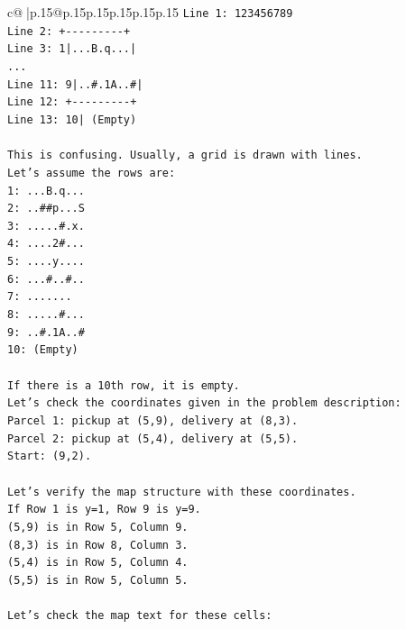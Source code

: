 \documentclass{article}
\begin{document}
{\begin{supertabular}{c@{$\;$}|p{.15\linewidth}@{}p{.15\linewidth}p{.15\linewidth}p{.15\linewidth}p{.15\linewidth}p{.15\linewidth}}
{{{\texttt{Line 1: 123456789} \\
\texttt{Line 2: +{-}{-}{-}{-}{-}{-}{-}{-}{-}+} \\
\texttt{Line 3: 1|...B.q...|} \\
\texttt{...} \\
\texttt{Line 11: 9|..\#.1A..\#|} \\
\texttt{Line 12: +{-}{-}{-}{-}{-}{-}{-}{-}{-}+} \\
\texttt{Line 13: 10| (Empty)} \\
\\ 
\texttt{This is confusing. Usually, a grid is drawn with lines.} \\
\texttt{Let's assume the rows are:} \\
\texttt{1: ...B.q...} \\
\texttt{2: ..\#\#p...S} \\
\texttt{3: .....\#.x.} \\
\texttt{4: ....2\#...} \\
\texttt{5: ....y....} \\
\texttt{6: ...\#..\#..} \\
\texttt{7: .......} \\
\texttt{8: .....\#...} \\
\texttt{9: ..\#.1A..\#} \\
\texttt{10: (Empty)} \\
\\ 
\texttt{If there is a 10th row, it is empty.} \\
\texttt{Let's check the coordinates given in the problem description:} \\
\texttt{Parcel 1: pickup at (5,9), delivery at (8,3).} \\
\texttt{Parcel 2: pickup at (5,4), delivery at (5,5).} \\
\texttt{Start: (9,2).} \\
\\ 
\texttt{Let's verify the map structure with these coordinates.} \\
\texttt{If Row 1 is y=1, Row 9 is y=9.} \\
\texttt{(5,9) is in Row 5, Column 9.} \\
\texttt{(8,3) is in Row 8, Column 3.} \\
\texttt{(5,4) is in Row 5, Column 4.} \\
\texttt{(5,5) is in Row 5, Column 5.} \\
\\ 
\texttt{Let's check the map text for these cells:} \\
}}}
\end{supertabular}}
\end{document}
